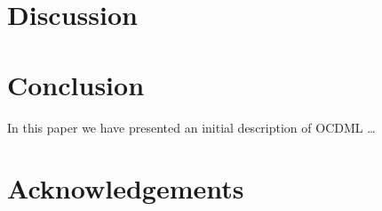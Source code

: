 \documentclass[11pt]{article}
\begin{document}
\section{Discussion} %
\label{sec:discussion}




\section{Conclusion} %
\label{sec:conclusion}
In this paper we have presented an initial description of OCDML \ldots

\section*{Acknowledgements} %
\label{sec:acknowledgements}





\end{document}
